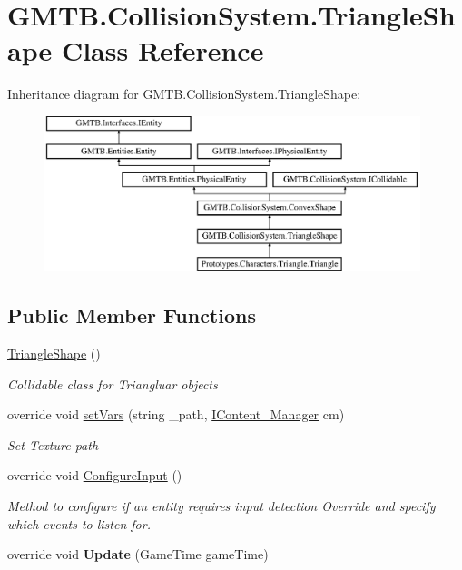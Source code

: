 \hypertarget{class_g_m_t_b_1_1_collision_system_1_1_triangle_shape}{}\section{G\+M\+T\+B.\+Collision\+System.\+Triangle\+Shape Class Reference}
\label{class_g_m_t_b_1_1_collision_system_1_1_triangle_shape}
Inheritance diagram for G\+M\+T\+B.\+Collision\+System.\+Triangle\+Shape\+:\begin{figure}[H]
\begin{center}
\leavevmode
\includegraphics[height=4.534413cm]{class_g_m_t_b_1_1_collision_system_1_1_triangle_shape}
\end{center}
\end{figure}
\subsection*{Public Member Functions}
\begin{DoxyCompactItemize}
\item 
\mbox{\hyperlink{class_g_m_t_b_1_1_collision_system_1_1_triangle_shape_aaba9290967fc804a9d1f7b8c5a05bbba}{Triangle\+Shape}} ()
\begin{DoxyCompactList}\small\item\em Collidable class for Triangluar objects \end{DoxyCompactList}\item 
override void \mbox{\hyperlink{class_g_m_t_b_1_1_collision_system_1_1_triangle_shape_a4389017110af14cca74a2a26475eccd6}{set\+Vars}} (string \+\_\+path, \mbox{\hyperlink{interface_g_m_t_b_1_1_interfaces_1_1_i_content___manager}{I\+Content\+\_\+\+Manager}} cm)
\begin{DoxyCompactList}\small\item\em Set Texture path \end{DoxyCompactList}\item 
override void \mbox{\hyperlink{class_g_m_t_b_1_1_collision_system_1_1_triangle_shape_a418c3ebbaa4187f74e922ccbea1520ef}{Configure\+Input}} ()
\begin{DoxyCompactList}\small\item\em Method to configure if an entity requires input detection Override and specify which events to listen for. \end{DoxyCompactList}\item 
\mbox{\label{class_g_m_t_b_1_1_collision_system_1_1_triangle_shape_a1b0a6c49bc7be9d3cf901f6f6106f318}} 
override void {\bfseries Update} (Game\+Time game\+Time)
\end{DoxyCompactItemize}
